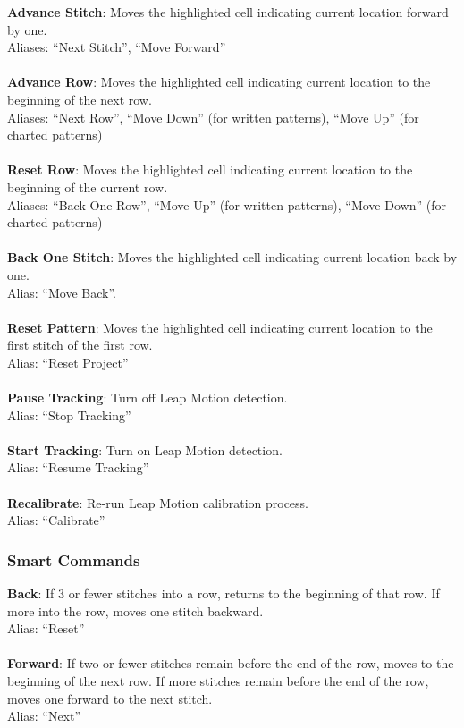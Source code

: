 \documentclass[11pt,twocolumn]{article}
\begin{document}
\textbf{Advance Stitch}: Moves the highlighted cell indicating current location forward by one.
\\ Aliases: ``Next Stitch'', ``Move Forward''
\\ \\
\textbf{Advance Row}: Moves the highlighted cell indicating current location to the beginning of the next row.
\\ Aliases: ``Next Row'', ``Move Down'' (for written patterns), ``Move Up'' (for charted patterns)
\\ \\
\textbf{Reset Row}: Moves the highlighted cell indicating current location to the beginning of the current row.
\\ Aliases: ``Back One Row'', ``Move Up'' (for written patterns), ``Move Down'' (for charted patterns)
\\ \\
\textbf{Back One Stitch}: Moves the highlighted cell indicating current location back by one.
\\ Alias: ``Move Back''.
\\ \\
\textbf{Reset Pattern}: Moves the highlighted cell indicating current location to the first stitch of the first row.
\\ Alias: ``Reset Project''
\\ \\
\textbf{Pause Tracking}: Turn off Leap Motion detection.
\\ Alias: ``Stop Tracking''
\\ \\
\textbf{Start Tracking}: Turn on Leap Motion detection.
\\ Alias: ``Resume Tracking''
\\ \\
\textbf{Recalibrate}: Re-run Leap Motion calibration process.
\\ Alias: ``Calibrate''


\subsubsection{Smart Commands}

\textbf{Back}: If 3 or fewer stitches into a row, returns to the beginning of that row.
If more into the row, moves one stitch backward.
\\ Alias: ``Reset''
\\ \\
\textbf{Forward}: If two or fewer stitches remain before the end of the row, moves to the beginning of the next row.
If more stitches remain before the end of the row, moves one forward to the next stitch.
\\ Alias: ``Next''
\end{document}
